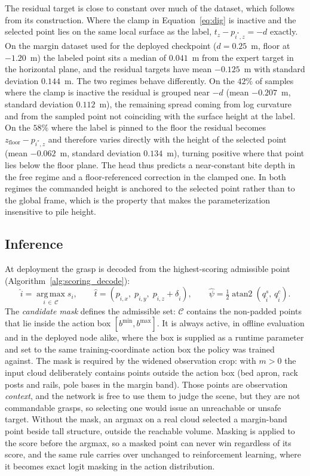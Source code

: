The residual target is close to constant over much of the dataset, which
follows from its construction. Where the clamp in Equation~\eqref{eq:dig} is
inactive and the selected point lies on the same local surface as the label,
$t_z - p_{i^*, z} = -d$ exactly. On the margin dataset used for the deployed
checkpoint ($d = 0.25$~m, floor at $-1.20$~m) the labeled point sits a median
of $0.041$~m from the expert target in the horizontal plane, and the residual
targets have mean $-0.125$~m with standard deviation $0.144$~m. The two
regimes behave differently. On the $42\%$ of samples where the clamp is
inactive the residual is grouped near $-d$ (mean $-0.207$~m, standard
deviation $0.112$~m), the remaining spread coming from log curvature and from
the sampled point not coinciding with the surface height at the label. On the
$58\%$ where the label is pinned to the floor the residual becomes
$z_{\mathrm{floor}} - p_{i^*, z}$ and therefore varies directly with the
height of the selected point (mean $-0.062$~m, standard deviation
$0.134$~m), turning positive where that point lies below the floor plane. The
head thus predicts a near-constant bite depth in the free regime and a
floor-referenced correction in the clamped one. In both regimes the commanded
height is anchored to the selected point rather than to the global frame,
which is the property that makes the parameterization insensitive to pile
height.

\subsection{Inference}

At deployment the grasp is decoded from the highest-scoring admissible point
(Algorithm~\ref{alg:scoring_decode}):
\begin{equation}
  \hat{i} = \operatorname*{arg\,max}_{i \,\in\, \mathcal{C}} s_i, \qquad
  \hat{t} = \left( p_{\hat{i},x},\; p_{\hat{i},y},\; p_{\hat{i},z} + \delta_{\hat{i}} \right), \qquad
  \hat{\psi} = \tfrac{1}{2} \operatorname{atan2}\!\left( q_{\hat{i}}^s,\, q_{\hat{i}}^c \right).
\end{equation}
The \emph{candidate mask} defines the admissible set: $\mathcal{C}$ contains
the non-padded points that lie inside the action box
$[b^{\min}, b^{\max}]$. It is always active, in offline evaluation and in
the deployed node alike, where the box is supplied as a runtime parameter and
set to the same training-coordinate action box the policy was trained
against. The mask is required by the widened observation crop: with
$m > 0$ the input cloud deliberately contains points outside the action box
(bed apron, rack posts and rails, pole bases in the margin band). Those
points are observation \emph{context}, and the network is free to use them to
judge the scene, but they are not commandable grasps, so selecting one would
issue an unreachable or unsafe target. Without the mask, an argmax on a real
cloud selected a margin-band point beside tall structure, outside the
reachable volume. Masking is applied to the
score before the argmax, so a masked point can never win regardless of its
score, and the same rule carries over unchanged to reinforcement learning,
where it becomes exact logit masking in the action distribution.

